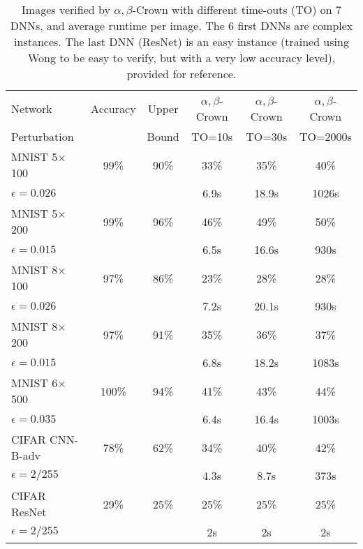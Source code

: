 \begin{table}[t!]
	\centering
	\begin{tabular}{||l|c|c||c|c|c||}
		\hline
		Network & Accuracy & Upper  & $\alpha,\beta$-Crown& $\alpha,\beta$-Crown & $\alpha,\beta$-Crown \\ 
		Perturbation &   & Bound & TO=10s & TO=30s & TO=2000s\\ \hline
		MNIST 5$\times$100 & 99\% & 90\% & 33\% & 35\% & 40\%   \\
		$\epsilon = 0.026$ &  &  & 6.9s &  18.9s &  1026s  \\  \hline
		MNIST 5$\times$200 & 99\%  & 96\%  & 46\%  & 49\%  & 50\%   \\ 
		$\epsilon = 0.015$ & &  & 6.5s &  16.6s &  930s  \\  \hline
		MNIST 8$\times$100 & 97\%  & 86\%  & 23\%  & 28\%  & 28\%   \\
		$\epsilon = 0.026$ &  &  & 7.2s &  20.1s &  930s  \\  \hline
		MNIST 8$\times$200 & 97\%  & 91\%  & 35\%  & 36\%  & 37\%   \\ 
		$\epsilon = 0.015$ & &  & 6.8s &  18.2s &  1083s  \\  \hline
		MNIST 6$\times$500 & 100\%  & 94\%  & 41\%  & 43\%  & 44\%   \\ 
		$\epsilon = 0.035$ & &  & 6.4s &  16.4s &  1003s  \\  \hline
		CIFAR CNN-B-adv & 78\%  & 62\%  &  34\% & 40\%  & 42\%   \\
		$\epsilon = 2/255$&  &  & 4.3s & 8.7s & 373s  \\ \hline \hline
		CIFAR ResNet & 29\%  & 25\%  & 25\%  & 25\%  & 25\%   \\
		$\epsilon = 2/255$ &  &  & 2s & 2s & 2s  \\ \hline
	\end{tabular}
	\caption{Images verified by $\alpha,\beta$-Crown with different time-outs (TO) on 7 DNNs, and average runtime per image. The 6 first DNNs are complex instances. The last DNN (ResNet) is an easy instance (trained using Wong to be easy to verify, but with a very low accuracy level), provided for reference.
	\vspace{-0.5cm}}
	\label{table_beta}
\end{table}

